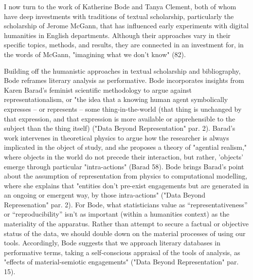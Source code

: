 \documentclass[11pt]{article}
\begin{document}
I now turn to the work of Katherine Bode and Tanya Clement, both of
whom have deep investments with traditions of textual scholarship,
particularly the scholarship of Jerome McGann, that has influenced
early experiments with digital humanities in English
departments. Although their approaches vary in their specific topics,
methods, and results, they are connected in an investment for, in the
words of McGann, "imagining what we don't know" (82).

Building off the humanistic approaches in textual scholarship and
bibliography, Bode reframes literary analysis as performative. Bode
incorporates insights from Karen Barad's feminist scientific
methodology to argue against representationalism, or "the idea that a
knowing human agent symbolically expresses – or represents – some
thing-in-the-world (that thing is unchanged by that expression, and
that expression is more available or apprehensible to the subject than
the thing itself) ("Data Beyond Representation" par. 2). Barad's work
intervenes in theoretical physics to argue how the researcher is
always implicated in the object of study, and she proposes a theory of
"agential realism," where objects in the world do not precede their
interaction, but rather, 'objects' emerge through particular
"intra-actions" (Barad 58). Bode brings Barad's point about the
assumption of representation from physics to computational modelling,
where she explains that "entities don’t pre-exist engagements but are
generated in an ongoing or emergent way, by those intra-actions"
("Data Beyond Represenation" par. 2). For Bode, what statisticians
value as “representativeness” or “reproducibility” isn’t as important
(within a humanities context) as the materiality of the
apparatus. Rather than attempt to secure a factual or objective status
of the data, we should double down on the material processes of using
our tools. Accordingly, Bode suggests that we approach literary
databases in performative terms, taking a self-conscious appraisal of
the tools of analysis, as "effects of material-semiotic engagements"
("Data Beyond Representation" par. 15).
\end{document}
